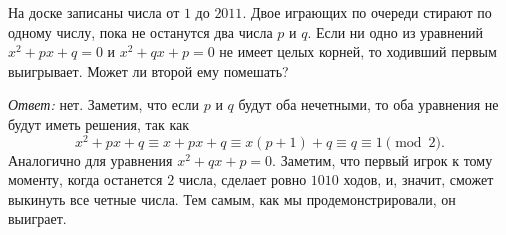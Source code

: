 \problem
На доске записаны числа от $1$ до $2011$.
Двое играющих по очереди стирают по одному числу, пока не останутся два числа
$p$ и $q$.
Если ни одно из уравнений $x^2 + p x + q = 0$ и $x^2 + q x + p = 0$ не имеет
целых корней, то ходивший первым выигрывает.
Может ли второй ему помешать?

\solution
\emph{Ответ:} нет.
Заметим, что если $p$ и $q$ будут оба нечетными, то оба уравнения не будут
иметь решения, так как
\[
   x^2 + p x + q
\equiv
   x + p x + q
\equiv
   x (p + 1) + q
\equiv
   q
\equiv
   1
\pmod{2}
.\]
Аналогично для уравнения $x^2 + q x + p = 0$.
Заметим, что первый игрок к тому моменту, когда останется $2$ числа, сделает
ровно $1010$ ходов, и, значит, сможет выкинуть все четные числа.
Тем самым, как мы продемонстрировали, он выиграет.

\endproblem
